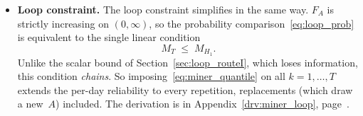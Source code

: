 \documentclass[11pt,a4paper]{article}
\theoremstyle{plain}
\theoremstyle{definition}
\theoremstyle{remark}
\begin{document}
\begin{itemize}
    Without repair since the last replacement, and with $n_{ij}$ counted from it, rewriting $M_k \le q_\varepsilon$ as
    \begin{equation}
      \sum_j n_{ij}\,n_j/(q_\varepsilon \bar N_j) \;\le\; 1
    \end{equation}
    gives back a classical design practice: deterministic Miner on the $\varepsilon$-percentile lives
    \begin{equation}
      N^{(\varepsilon)}_j \;=\; q_\varepsilon \bar N_j,
    \end{equation}
    which are exactly the $\varepsilon$-quantiles of $N_{f,j}$.
    Here this practice is an \emph{exact} chance constraint rather than a heuristic, in the per-day sense of~\eqref{eq:abs_rel}.
  \item \textbf{Loop constraint.} The loop constraint simplifies in the same way.
    $F_A$ is strictly increasing on $(0,\infty)$, so the probability comparison~\eqref{eq:loop_prob} is equivalent to the single linear condition
\begin{equation}\label{eq:miner_loop_det}
  M_T \;\le\; M_{H_1}.
\end{equation}
    Unlike the scalar bound of Section~\ref{sec:loop_routeI}, which loses information, this condition \emph{chains}.
    So imposing~\eqref{eq:miner_quantile} on all $k = 1,\dots,T$ extends the per-day reliability to every repetition, replacements (which draw a new~$A$) included.
    The derivation is in Appendix~\ref{drv:miner_loop}, page~\pageref{drv:miner_loop}.
\end{itemize}
\end{document}

